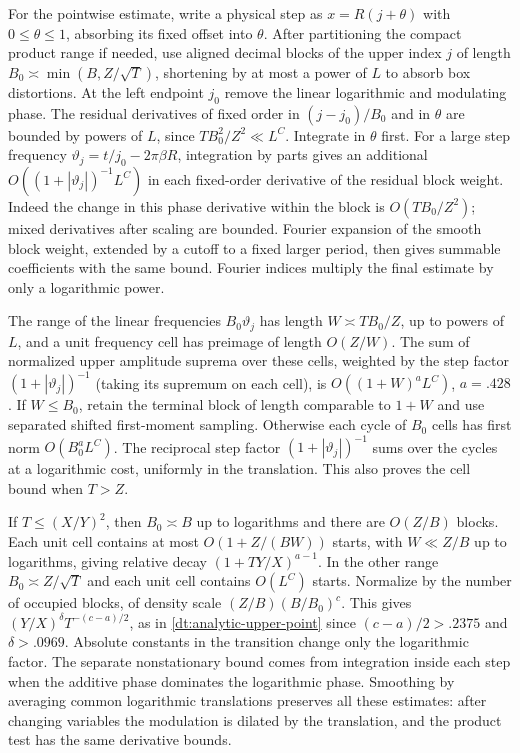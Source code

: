 \documentclass[11pt,a4paper]{article}
\theoremstyle{paperplain}
\numberwithin{equation}{section}
\begin{document}
For the pointwise estimate, write a physical step as \(x=R(j+\theta)\)
with \(0\le\theta\le1\), absorbing its fixed offset into \(\theta\).
After partitioning the compact product range if needed, use aligned
decimal blocks of the upper index \(j\) of length
\(B_0\asymp\min(B,Z/\sqrt T)\), shortening by at most a power of \(L\)
to absorb box distortions. At the left endpoint \(j_0\) remove
the linear logarithmic and modulating phase. The residual derivatives
of fixed order in \((j-j_0)/B_0\) and in \(\theta\) are bounded by
powers of \(L\), since \(TB_0^2/Z^2\ll L^C\).
Integrate in \(\theta\) first. For a large step frequency
\(\vartheta_j=t/j_0-2\pi\beta R\), integration by parts gives
an additional \(O((1+|\vartheta_j|)^{-1}L^C)\) in each fixed-order
derivative of the residual block weight. Indeed the change in this
phase derivative within the block is \(O(TB_0/Z^2)\); mixed derivatives
after scaling are bounded. Fourier expansion of the smooth block
weight, extended by a cutoff to a fixed larger period, then gives
summable coefficients with the same bound. Fourier indices multiply
the final estimate by only a logarithmic power.

The range of the linear frequencies \(B_0\vartheta_j\) has length
\(W\asymp TB_0/Z\), up to powers of \(L\), and a unit frequency cell
has preimage of length \(O(Z/W)\). The sum of normalized upper amplitude suprema over these cells,
weighted by the step factor \((1+|\vartheta_j|)^{-1}\) (taking its
supremum on each cell), is \(O((1+W)^a L^C)\), \(a=.428\).
If \(W\le B_0\), retain the terminal block of length comparable to
\(1+W\) and use separated shifted first-moment sampling. Otherwise
each cycle of \(B_0\) cells has first norm \(O(B_0^aL^C)\).
The reciprocal step factor \((1+|\vartheta_j|)^{-1}\) sums over
the cycles at a logarithmic cost, uniformly in the translation.
This also proves the cell bound when \(T>Z\).

If \(T\le (X/Y)^2\), then \(B_0\asymp B\) up to logarithms and
there are \(O(Z/B)\) blocks. Each unit cell contains at most
\(O(1+Z/(BW))\) starts, with \(W\ll Z/B\) up to logarithms, giving
relative decay \((1+TY/X)^{a-1}\).
In the other range \(B_0\asymp Z/\sqrt T\) and each unit cell
contains \(O(L^C)\) starts. Normalize by the number of occupied
blocks, of density scale \((Z/B)(B/B_0)^c\).
This gives \((Y/X)^\delta T^{-(c-a)/2}\), as in
\eqref{dt:analytic-upper-point} since \((c-a)/2>.2375\) and
\(\delta>.0969\). Absolute constants in the transition change
only the logarithmic factor. The separate nonstationary bound
comes from integration inside each step when the additive phase
dominates the logarithmic phase. Smoothing by averaging common
logarithmic translations preserves all these estimates: after
changing variables the modulation is dilated by the translation,
and the product test has the same derivative bounds.
\end{document}
